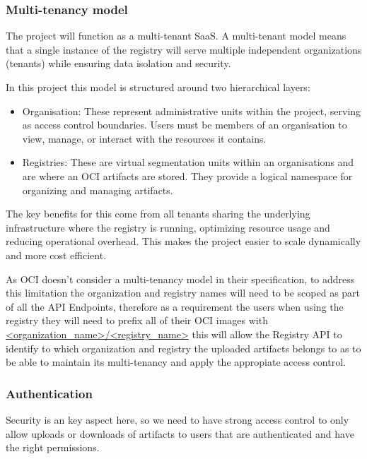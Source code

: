\documentclass{article}
\begin{document}
  \subsubsection{Multi-tenancy model}

  The project will function as a multi-tenant SaaS. A multi-tenant model means that a single instance of the registry will serve multiple independent organizations (tenants) while ensuring data isolation and security.

  In this project this model is structured around two hierarchical layers:

  \begin{itemize}
    \item Organisation: These represent administrative units within the project, serving as access control boundaries. Users must be members of an organisation to view, manage, or interact with the resources it contains.
    \item Registries: These are virtual segmentation units within an organisations and are where an OCI artifacts are stored. They provide a logical namespace for organizing and managing artifacts.
  \end{itemize}

  The key benefits for this come from all tenants sharing the underlying infrastructure where the registry is running, optimizing resource usage and reducing operational overhead. This makes the project easier to scale dynamically and more cost efficient.

  As OCI doesn't consider a multi-tenancy model in their specification, to address this limitation the organization and registry names will need to be scoped as part of all the API Endpoints, therefore as a requirement the users when using the registry they will need to prefix all of their OCI images with \url{<organization_name>/<registry_name>} this will allow the Registry API to identify to which organization and registry the uploaded artifacts belongs to as to be able to maintain its multi-tenancy and apply the appropiate access control.
  
  \subsubsection{Authentication}

  Security is an key aspect here, so we need to have strong access control to only allow uploads or downloads of artifacts to users that are authenticated and have the right permissions.  
  
\end{document}
